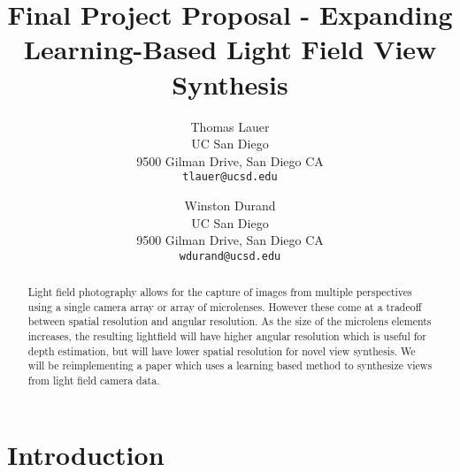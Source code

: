 \documentclass[10pt,twocolumn,letterpaper]{article}
\begin{document}
\title{Final Project Proposal - Expanding Learning-Based Light Field View Synthesis}

\author{Thomas Lauer\\
UC San Diego\\
9500 Gilman Drive, San Diego CA\\
{\tt\small tlauer@ucsd.edu}
\and
Winston Durand\\
UC San Diego\\
9500 Gilman Drive, San Diego CA\\
{\tt\small wdurand@ucsd.edu}
}

\maketitle

\begin{abstract}
Light field photography allows for the capture of images from multiple
perspectives using a single camera array or array of microlenses. However
these come at a tradeoff between spatial resolution and angular resolution.
As the size of the microlens elements increases, the resulting lightfield
will have higher angular resolution which is useful for depth estimation,
but will have lower spatial resolution for novel view synthesis.
We will be reimplementing a paper \cite{LearningViewSynthesis} which uses a
learning based method to synthesize views from light field camera data.
\end{abstract}


\section{Introduction}
\end{document}
